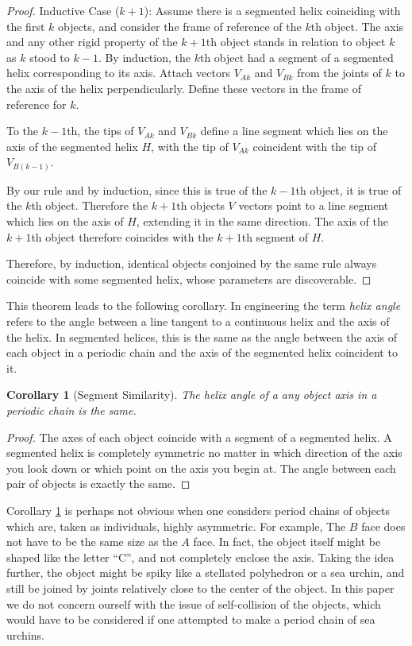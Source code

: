 \documentclass[11pt]{article}
\newtheorem{corollary}{Corollary}
\begin{document}
{\begin{proof}
  Inductive Case ($k+1$):
  Assume there is a segmented helix coinciding with the first $k$ objects, and
  consider the frame of reference of the $k$th object. The axis and any
  other rigid property of the $k+1$th object stands in relation to object $k$
  as $k$ stood to $k-1$. By induction, the $k$th object had a segment
  of a segmented helix corresponding to its axis. Attach vectors $V_{Ak}$ and $V_{Bk}$
  from the
  joints of $k$ to the axis of the helix perpendicularly. Define these
  vectors in the frame of reference for $k$.

  To the $k-1$th, the tips of  $V_{Ak}$ and $V_{Bk}$ define
  a line segment which lies on the axis of the segmented helix $H$, with the
  tip of $V_{Ak}$ coincident with the tip of $V_{B(k-1)}$.

  By our rule and by induction, since this is true of the $k-1$th object,
  it is true of the $k$th object. Therefore the $k+1$th objects $V$ vectors
  point to a line segment which lies on the axis of $H$, extending it
  in the same direction. The axis of the $k+1$th object therefore coincides
  with the $k+1$th segment of $H$.

  Therefore, by induction, identical objects conjoined by the same rule always
  coincide with some segmented helix, whose parameters are discoverable.
\end{proof}

This theorem leads to the following corollary. In engineering the term {\em helix angle} refers
to the angle between a line tangent to a continuous helix and
the axis of the helix. In segmented helices, this is the same
as the angle between the
axis of each object in a periodic chain and the axis of the
  segmented helix coincident to it.
\begin{corollary}[Segment Similarity]
  The helix angle of a any object axis in a periodic chain is the same.
  \label{cor:symmetric}
\end{corollary}

\begin{proof}
  The axes of each object coincide with a segment of a segmented helix.
  A segmented helix is completely symmetric no matter in which direction
  of the axis you look down or which point on the axis you begin at. The angle between each pair of objects
  is exactly the same.
\end{proof}

Corollary \ref{cor:symmetric} is perhaps not obvious when one considers
period chains of objects which are, taken as individuals, highly asymmetric.
For example,
The $B$ face does not have to be the same size as the $A$ face. In fact,
the object itself might be shaped like the letter ``C'', and not completely
enclose the axis. Taking the idea further, the object might be spiky
like a stellated polyhedron or a sea urchin, and still be joined by
joints relatively close to the center of the object. In this paper
we do not concern ourself with the issue of self-collision of the objects,
which would have to be considered if one attempted to make a period chain
of sea urchins.

}
\end{document}
